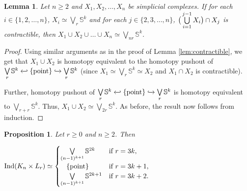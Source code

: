 \documentclass[12pt]{article}
\newtheorem{lem}[thm]{Lemma}
\numberwithin{thm}{section}
\newtheorem{prop}[thm]{Proposition}
\theoremstyle{definition}
\newcommand{\bS}{\mathbb{S}}
\newcommand{\ind}{{\rm{Ind}}}
\begin{document}
\begin{lem} \label{lem:wedge}
  	Let $n \geq 2$ and $X_1, X_2, \ldots, X_n$ be simplicial complexes. If for each $i \in \{1,2,\ldots,n\}$, $X_i\simeq \bigvee\limits_{r}\bS^k$ and for each $j \in \{2,3,\ldots, n\}$, $\big{(} \bigcup\limits_{i=1}^{j-1}X_i\big{)} \cap X_j$ is contractible, then $X_1 \cup X_2 \cup  \ldots \cup X_n\simeq \bigvee\limits_{nr}\bS^k$.
  	\end{lem}
  \begin{proof}
  
Using similar arguments as in the proof of Lemma \ref{lem:contractible}, we get that $X_1 \cup X_2$ is homotopy equivalent to the homotopy pushout of $\bigvee\limits_{r}\bS^k \xhookleftarrow{} \{\text{point}\}\xhookrightarrow{} \bigvee\limits_{r}\bS^k$ (since $X_1\simeq \bigvee\limits_{r}\bS^k \simeq X_2 $ and $X_1 \cap X_2$ is contractible).

Further, homotopy pushout of $\bigvee\limits_{r}\bS^k \xhookleftarrow{} \{\text{point}\}\xhookrightarrow{} \bigvee\limits_{r}\bS^k$ is homotopy equivalent to $\bigvee\limits_{r+r} \bS^{k}$. Thus, $X_1 \cup X_2 \simeq \bigvee\limits_{2r} \bS^{k}$. As before, the result now follows from induction.
 \end{proof}
  

  	
\begin{prop}\label{prop:main} Let $r \geq 0$ and $n \geq 2$. Then
			\begin{center}
		$ \ind(K_n\times L_{r}) \simeq 
		\begin{cases}
		\bigvee\limits_{(n-1)^{k+1}} \bS^{2k} & \text{if } r=3k, \\
		\hspace*{0.3cm} \{\rm{point}\} & \text{if} \ r = 3k+1,\\
		
		\bigvee\limits_{(n-1)^{k+1}} \bS^{2k+1} & \text{if } r= 3k+2. \\
		\end{cases}$
	\end{center}

	\end{prop}
\end{document}
